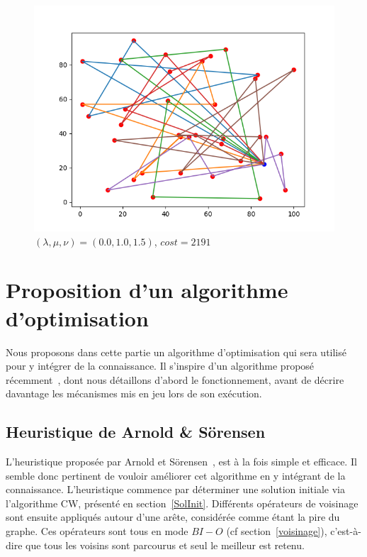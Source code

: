 \documentclass[a4paper,11pt]{article}%
\begin{document}
\begin{figure}
\begin{minipage}[c]{.42\linewidth}
	\caption{$(\lambda, \mu, \nu)=(0.1,0.1,0.1)$, $cost = 1569$}
	\label{resCW111}
    \end{minipage}
    
    
        \centering
	\includegraphics[scale=0.4]{resCW001015.png}
 	\caption{$(\lambda, \mu, \nu)=(0.0,1.0,1.5)$, $cost = 2191$}
 	\label{resCW001015}
    
\end{figure}

\section{Proposition d'un algorithme d'optimisation}
\label{opti}
Nous proposons dans cette partie un algorithme d'optimisation qui sera utilisé pour y intégrer de la connaissance. Il s'inspire d'un algorithme proposé récemment~\cite{Sorensen_2017}, dont nous détaillons d'abord le fonctionnement, avant de décrire davantage les mécanismes mis en jeu lors de son exécution.

\subsection{Heuristique de Arnold \& Sörensen}
L'heuristique proposée par Arnold et Sörensen~\cite{Sorensen_2017}, est à la fois simple et efficace. 
Il semble donc pertinent de vouloir améliorer cet algorithme en y intégrant de la connaissance.
L'heuristique commence par déterminer une solution initiale via l'algorithme CW, présenté en section~\ref{SolInit}. Différents opérateurs de voisinage sont ensuite appliqués autour d'une arête, considérée comme étant la pire du graphe. Ces opérateurs sont tous en mode $BI-O$ (cf section~\ref{voisinage}), c'est-à-dire que tous les voisins sont parcourus et seul le meilleur est retenu.
\end{document}

